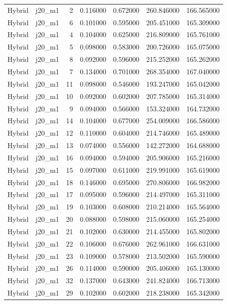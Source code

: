 \begin{tabular}{llrrrrr}
Hybrid & j20_m1 & 2 & 0.116000 & 0.672000 & 260.846000 & 166.565000 \\
Hybrid & j20_m1 & 6 & 0.101000 & 0.595000 & 205.451000 & 165.309000 \\
Hybrid & j20_m1 & 4 & 0.104000 & 0.625000 & 216.809000 & 165.761000 \\
Hybrid & j20_m1 & 5 & 0.098000 & 0.583000 & 200.726000 & 165.075000 \\
Hybrid & j20_m1 & 8 & 0.092000 & 0.596000 & 215.252000 & 165.262000 \\
Hybrid & j20_m1 & 7 & 0.134000 & 0.701000 & 268.354000 & 167.040000 \\
Hybrid & j20_m1 & 11 & 0.098000 & 0.546000 & 193.247000 & 165.042000 \\
Hybrid & j20_m1 & 10 & 0.092000 & 0.602000 & 207.785000 & 165.314000 \\
Hybrid & j20_m1 & 9 & 0.094000 & 0.566000 & 153.324000 & 164.732000 \\
Hybrid & j20_m1 & 14 & 0.104000 & 0.677000 & 254.009000 & 166.586000 \\
Hybrid & j20_m1 & 12 & 0.110000 & 0.604000 & 214.746000 & 165.489000 \\
Hybrid & j20_m1 & 13 & 0.074000 & 0.556000 & 142.272000 & 164.688000 \\
Hybrid & j20_m1 & 16 & 0.094000 & 0.594000 & 205.906000 & 165.216000 \\
Hybrid & j20_m1 & 15 & 0.097000 & 0.611000 & 219.991000 & 165.619000 \\
Hybrid & j20_m1 & 18 & 0.146000 & 0.695000 & 270.806000 & 166.982000 \\
Hybrid & j20_m1 & 17 & 0.095000 & 0.596000 & 214.497000 & 165.311000 \\
Hybrid & j20_m1 & 19 & 0.103000 & 0.608000 & 210.214000 & 165.564000 \\
Hybrid & j20_m1 & 20 & 0.088000 & 0.598000 & 215.060000 & 165.254000 \\
Hybrid & j20_m1 & 21 & 0.102000 & 0.630000 & 214.455000 & 165.802000 \\
Hybrid & j20_m1 & 22 & 0.106000 & 0.676000 & 262.961000 & 166.631000 \\
Hybrid & j20_m1 & 23 & 0.109000 & 0.578000 & 213.502000 & 165.590000 \\
Hybrid & j20_m1 & 26 & 0.114000 & 0.590000 & 205.406000 & 165.130000 \\
Hybrid & j20_m1 & 32 & 0.137000 & 0.643000 & 241.824000 & 166.713000 \\
Hybrid & j20_m1 & 29 & 0.102000 & 0.602000 & 218.238000 & 165.342000 \\

\end{tabular}
